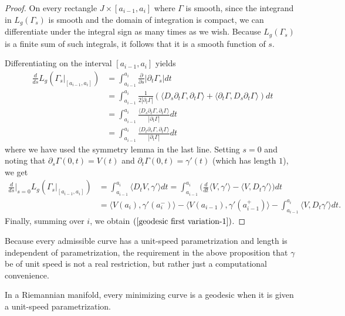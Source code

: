 \begin{proof}
On every rectangle $J\times[a_{i-1},a_i]$ where $\Gamma$ is smooth, since the integrand in $L_g(\Gamma_s)$ is smooth and the domain of integration is compact, we can 
differentiate under the integral sign as many times as we wish. Because $L_g(\Gamma_s)$ is a finite sum of such integrals, it follows that it is a smooth function of $s$.\par
Differentiating on the interval $[a_{i-1},a_i]$ yields
\begin{align*}
\frac{d}{ds}L_g(\Gamma_s|_{[a_{i-1},a_i]})&=\int_{a_{i-1}}^{a_i}\frac{\partial}{\partial s}|\partial_t\Gamma_s|dt\\
&=\int_{a_{i-1}}^{a_i}\frac{1}{2|\partial_t\Gamma|}(\langle D_s\partial_t\Gamma,\partial_t\Gamma\rangle+\langle\partial_t\Gamma,D_s\partial_t\Gamma\rangle)dt\\
&=\int_{a_{i-1}}^{a_i}\frac{\langle D_s\partial_t\Gamma,\partial_t\Gamma\rangle}{|\partial_t\Gamma|}dt\\
&=\int_{a_{i-1}}^{a_i}\frac{\langle D_t\partial_s\Gamma,\partial_t\Gamma\rangle}{|\partial_t\Gamma|}dt
\end{align*}
where we have used the symmetry lemma in the last line. Setting $s=0$ and noting that $\partial_s\Gamma(0,t)=V(t)$ and $\partial_t\Gamma(0,t)=\gamma'(t)$ (which has length $1$), 
we get
\begin{align*}
\frac{d}{ds}\Big|_{s=0}L_g(\Gamma_s|_{[a_{i-1},a_i]})&=\int_{a_{i-1}}^{a_i}\langle D_tV,\gamma'\rangle dt=\int_{a_{i-1}}^{a_i}\Big(\frac{d}{dt}\langle V,\gamma'\rangle-\langle V,D_t\gamma'\rangle\Big)dt\\
&=\langle V(a_i),\gamma'(a_i^-)\rangle-\langle V(a_{i-1}),\gamma'(a_{i-1}^+)\rangle-\int_{a_{i-1}}^{a_i}\langle V,D_t\gamma'\rangle dt.
\end{align*}
Finally, summing over $i$, we obtain $(\ref{geodesic first variation-1})$.
\end{proof}
Because every admissible curve has a unit-speed parametrization and length is independent of parametrization, the requirement in the above proposition that $\gamma$ be of 
unit speed is not a real restriction, but rather just a computational convenience.
\begin{theorem}\label{Riemann minimizing is geodesic}
In a Riemannian manifold, every minimizing curve is a geodesic when it is given a unit-speed parametrization.
\end{theorem}
